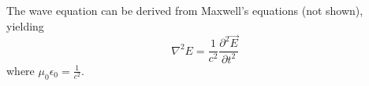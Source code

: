 
The wave equation can be derived from Maxwell's equations (not shown), yielding
\begin{equation}
\nabla^2 E = \frac{1}{c^2} \frac{\partial^2\vec{E}}{\partial t^2}
\label{eq:general_wave_equ}
\end{equation}
where $\mu_0 \epsilon_0 = \frac{1}{c^2}$. 

